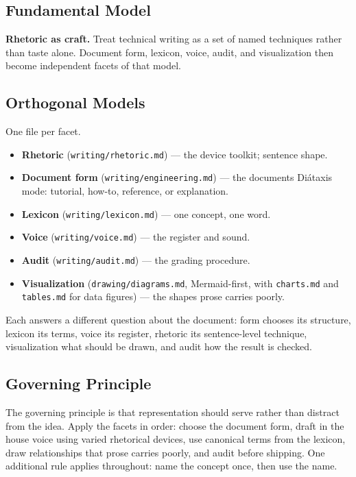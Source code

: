 \subsection{Fundamental Model}\label{heading:fundamental-model}

\textbf{Rhetoric as craft.} Treat technical writing as a set of named techniques rather than taste alone. Document form, lexicon, voice, audit, and visualization then become independent facets of that model.

\subsection{Orthogonal Models}\label{heading:orthogonal-models}

One file per facet.

\begin{itemize}
\tightlist
\item
  \textbf{Rhetoric} (\texttt{writing/rhetoric.md}) --- the device toolkit; sentence shape.
\item
  \textbf{Document form} (\texttt{writing/engineering.md}) --- the document\textquotesingle s Diátaxis mode: tutorial, how-to, reference, or explanation.
\item
  \textbf{Lexicon} (\texttt{writing/lexicon.md}) --- one concept, one word.
\item
  \textbf{Voice} (\texttt{writing/voice.md}) --- the register and sound.
\item
  \textbf{Audit} (\texttt{writing/audit.md}) --- the grading procedure.
\item
  \textbf{Visualization} (\texttt{drawing/diagrams.md}, Mermaid-first, with \texttt{charts.md} and \texttt{tables.md} for data figures) --- the shapes prose carries poorly.
\end{itemize}

Each answers a different question about the document: form chooses its structure, lexicon its terms, voice its register, rhetoric its sentence-level technique, visualization what should be drawn, and audit how the result is checked.

\subsection{Governing Principle}\label{heading:governing-principle}

The governing principle is that representation should serve rather than distract from the idea. Apply the facets in order: choose the document form, draft in the house voice using varied rhetorical devices, use canonical terms from the lexicon, draw relationships that prose carries poorly, and audit before shipping. One additional rule applies throughout: name the concept once, then use the name.

